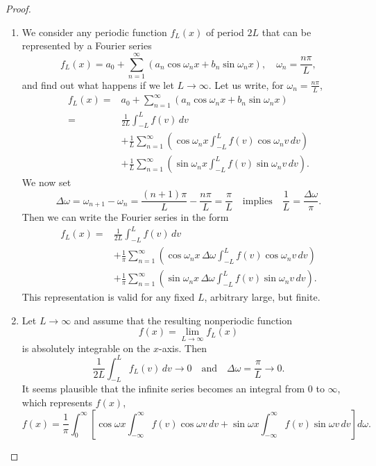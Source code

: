 \documentclass[12pt,openany]{book}
\theoremstyle{definition}
\begin{document}
	\begin{proof}
		\begin{enumerate}[(1)]
			\item 
			We consider any periodic function \( f_L(x) \) of period \( 2L \) that can be represented by a Fourier series
			\[
			f_L(x) = a_0 + \sum_{n=1}^{\infty} \left( a_n \cos \omega_n x + b_n \sin \omega_n x \right), \quad \omega_n = \frac{n\pi}{L},
			\]
			and find out what happens if we let \( L \rightarrow \infty \).
			Let us write, for $\omega_n = \frac{n\pi}{L}$, \begin{align*}
				f_L(x)=&  a_0 + \sum_{n=1}^{\infty} \left( a_n \cos \omega_n x + b_n \sin \omega_n x \right)
				\\=& \frac{1}{2L} \int_{-L}^{L} f(v) \, dv \\&+ \frac{1}{L} \sum_{n=1}^{\infty} \left( \cos \omega_n x \int_{-L}^{L} f(v) \cos \omega_n v \, dv \right) \\&+ \frac{1}{L} \sum_{n=1}^{\infty} \left( \sin \omega_n x \int_{-L}^{L} f(v) \sin \omega_n v \, dv \right).
			\end{align*} We now set
			\[
			\Delta \omega = \omega_{n+1} - \omega_n = \frac{(n + 1)\pi}{L} - \frac{n\pi}{L} = \frac{\pi}{L} \quad \text{implies} \quad \frac{1}{L} = \frac{\Delta \omega}{\pi}.
			\] Then we can write the Fourier series in the form
			\begin{align*}
				f_L(x) =& \frac{1}{2L} \int_{-L}^{L} f(v) \, dv\\
				& + \frac{1}{\pi} \sum_{n=1}^{\infty} \left( \cos \omega_n x \, \Delta \omega \int_{-L}^{L} f(v) \cos \omega_n v \, dv \right) \\
				&+ \frac{1}{\pi} \sum_{n=1}^{\infty} \left( \sin \omega_n x \, \Delta \omega \int_{-L}^{L} f(v) \sin \omega_n v \, dv \right).
			\end{align*}
			This representation is valid for any fixed \( L \), arbitrary large, but finite.
			\item Let \( L \to \infty \) and assume that the resulting nonperiodic function
			\[
			f(x) = \lim_{L \to \infty} f_L(x)
			\]
			is absolutely integrable on the \( x \)-axis. Then
			\[
			\frac{1}{2L} \int_{-L}^{L} f_L(v) \, dv \to 0 \quad \text{and} \quad \Delta \omega = \frac{\pi}{L} \to 0.
			\] It seems plausible that the infinite series becomes an integral from 0 to \( \infty \), which represents \( f(x) \),
			\[
			f(x) = \frac{1}{\pi} \int_{0}^{\infty} \left[ \cos \omega x \int_{-\infty}^{\infty} f(v) \cos \omega v \, dv + \sin \omega x \int_{-\infty}^{\infty} f(v) \sin \omega v \, dv \right] d\omega.
			\]
		\end{enumerate}
	\end{proof}
\end{document}

